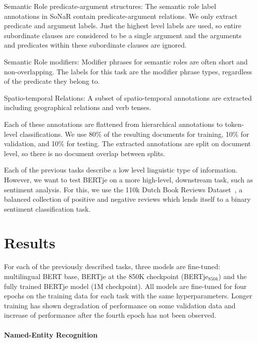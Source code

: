 \documentclass[11pt]{article}
\begin{document}
\begin{description*}
  \item[Semantic Role predicate-argument structures:] The semantic role label annotations in SoNaR contain predicate-argument relations. We only extract predicate and argument labels. Just the highest level labels are used, so entire subordinate clauses are considered to be a single argument and the arguments and predicates within these subordinate clauses are ignored.
  \item[Semantic Role modifiers:] Modifier phrases for semantic roles are often short and non-overlapping. The labels for this task are the modifier phrase types, regardless of the predicate they belong to.
  \item[Spatio-temporal Relations:] A subset of spatio-temporal annotations are extracted including geographical relations and verb tenses.
\end{description*}

\noindent Each of these annotations are flattened from hierarchical annotations to token-level classifications.
We use 80\% of the resulting documents for training,
10\% for validation, and 10\% for testing.
The extracted annotations are split on document level,
so there is no document overlap between splits.

Each of the previous tasks describe a low level linguistic type of information. However, we want to test BERTje on a more high-level, downstream task, such as sentiment analysis. For this, we use the 110k Dutch Book Reviews Dataset~\citep{burgh2019merits},
a balanced collection of positive and negative reviews which lends itself to a binary sentiment classification task.

\section{Results}

For each of the previously described tasks, three models are fine-tuned: multilingual BERT base, BERTje at the 850K checkpoint (BERTje$_{850k}$)
and the fully trained BERTje model (1M checkpoint).
All models are fine-tuned for four epochs on the training data for each task with the same hyperparameters.
Longer training has shown degradation of performance on some validation data and increase of performance after the fourth epoch has not been observed.

\paragraph{Named-Entity Recognition}
\end{document}
